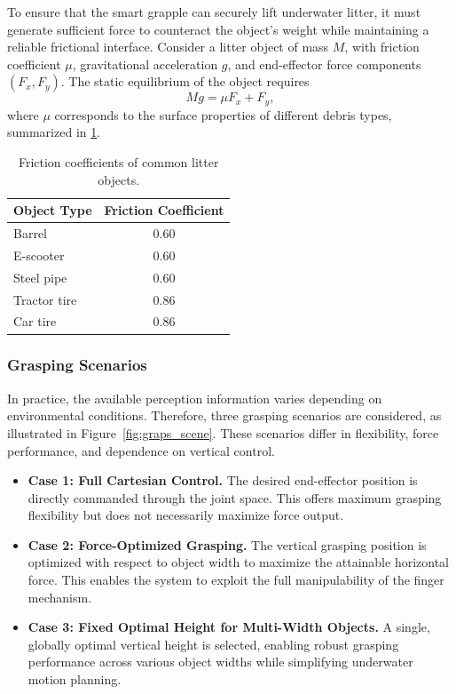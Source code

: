 \documentclass[a4paper,11pt]{article}
\begin{document}
To ensure that the smart grapple can securely lift underwater litter, it must generate sufficient force to counteract the object’s weight while maintaining a reliable frictional interface. Consider a litter object of mass $M$, with friction coefficient $\mu$, gravitational acceleration $g$, and end-effector force components $(F_x, F_y)$. The static equilibrium of the object requires
\begin{equation}
    Mg = \mu F_x + F_y,
\end{equation}
where $\mu$ corresponds to the surface properties of different debris types, summarized in \cref{tab:friction_coeff}.

\begin{table}[h!]
\centering
\caption{Friction coefficients of common litter objects.}
\label{tab:friction_coeff}
\begin{tabular}{l c}
\hline
\textbf{Object Type} & \textbf{Friction Coefficient} \\
\hline
Barrel         & 0.60  \\
E-scooter      & 0.60  \\
Steel pipe     & 0.60  \\
Tractor tire   & 0.86  \\
Car tire       & 0.86  \\
\hline
\end{tabular}
\end{table}

\subsubsection{Grasping Scenarios}   \label{sec:percentageControlImplementation}
In practice, the available perception information varies depending on environmental conditions. Therefore, three grasping scenarios are considered, as illustrated in Figure~\ref{fig:graps_scene}. These scenarios differ in flexibility, force performance, and dependence on vertical control.   %

\begin{itemize}
    \item \textbf{Case 1: Full Cartesian Control.}  
    The desired end-effector position is directly commanded through the joint space. This offers maximum grasping flexibility but does not necessarily maximize force output.
    \item \textbf{Case 2: Force-Optimized Grasping.}  
    The vertical grasping position is optimized with respect to object width to maximize the attainable horizontal force. This enables the system to exploit the full manipulability of the finger mechanism.
    \item \textbf{Case 3: Fixed Optimal Height for Multi-Width Objects.}
    A single, globally optimal vertical height is selected, enabling robust grasping performance across various object widths while simplifying underwater motion planning.
\end{itemize}
\end{document}
